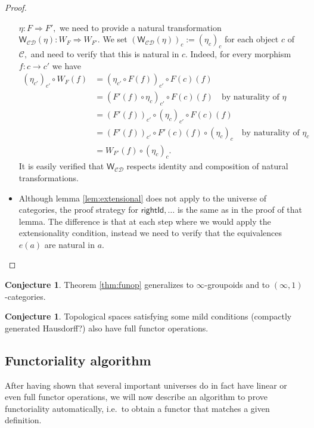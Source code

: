 \documentclass[a4paper]{article}
\theoremstyle{definition}
\newtheorem{conjecture}[definition]{Conjecture}
\theoremstyle{remark}
\newcommand{\C}{\mathcal{C}}
\newcommand{\D}{\mathcal{D}}
\newcommand{\nm}{\mathsf}
\newcommand{\combinator}{\nm}
\newcommand{\dupFun}{\combinator{W}}
\begin{document}
\begin{proof}
\begin{itemize}
    $\eta : F \Rightarrow F',$ we need to provide a natural transformation
    $\dupFun_{\C\D}(\eta) : W_F \Rightarrow W_{F'}.$ We set
    $(\dupFun_{\C\D}(\eta))_c := (\eta_c)_c$ for each object $c$ of $\C,$
    and need to verify that this is natural in $c.$ Indeed, for every
    morphism $f : c \to c'$ we have
    \begin{align*}
      (\eta_{c'})_{c'} \circ W_F(f) &= (\eta_{c'} \circ F(f))_{c'} \circ F(c)(f)\\
                                    &= (F'(f) \circ \eta_c)_{c'} \circ F(c)(f) \quad \text{by naturality of $\eta$}\\
                                    &= (F'(f))_{c'} \circ (\eta_c)_{c'} \circ F(c)(f)\\
                                    &= (F'(f))_{c'} \circ F'(c)(f) \circ (\eta_c)_c \quad \text{by naturality of $\eta_c$}\\
                                    &= W_{F'}(f) \circ (\eta_c)_c.
    \end{align*}
    It is easily verified that $\dupFun_{\C\D}$ respects identity and
    composition of natural transformations.
    \item Although lemma \ref{lem:extensional} does not apply to the universe of
    categories, the proof strategy for $\nm{rightId},\ldots$ is the same
    as in the proof of that lemma. The difference is that at each step where we
    would apply the extensionality condition, instead we need to verify that the
    equivalences $e(a)$ are natural in $a.$ \qedhere
  \end{itemize}
\end{proof}

\begin{conjecture}
  Theorem \ref{thm:funop} generalizes to $\infty$-groupoids and to
  $(\infty,1)$-categories.
\end{conjecture}

\begin{conjecture}
  Topological spaces satisfying some mild conditions (compactly generated Hausdorff?)
  also have full functor operations.
\end{conjecture}

\subsection{Functoriality algorithm}

After having shown that several important universes do in fact have linear or even full
functor operations, we will now describe an algorithm to prove functoriality
automatically, i.e.\ to obtain a functor that matches a given definition.
\end{document}
